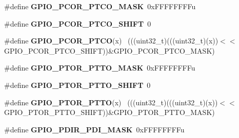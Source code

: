 \begin{DoxyCompactItemize}
\item 
\hypertarget{group___g_p_i_o___register___masks_ga0b8378768ee61ea2c685a1687c90fa03}{}\#define {\bfseries G\+P\+I\+O\+\_\+\+P\+C\+O\+R\+\_\+\+P\+T\+C\+O\+\_\+\+M\+A\+S\+K}~0x\+F\+F\+F\+F\+F\+F\+F\+Fu\label{group___g_p_i_o___register___masks_ga0b8378768ee61ea2c685a1687c90fa03}

\item 
\hypertarget{group___g_p_i_o___register___masks_ga5c9203b830cbd86cd8d0189872b5c772}{}\#define {\bfseries G\+P\+I\+O\+\_\+\+P\+C\+O\+R\+\_\+\+P\+T\+C\+O\+\_\+\+S\+H\+I\+F\+T}~0\label{group___g_p_i_o___register___masks_ga5c9203b830cbd86cd8d0189872b5c772}

\item 
\hypertarget{group___g_p_i_o___register___masks_ga3435ac6150be0f65562e575f41463272}{}\#define {\bfseries G\+P\+I\+O\+\_\+\+P\+C\+O\+R\+\_\+\+P\+T\+C\+O}(x)                                            ~(((uint32\+\_\+t)(((uint32\+\_\+t)(x))$<$$<$G\+P\+I\+O\+\_\+\+P\+C\+O\+R\+\_\+\+P\+T\+C\+O\+\_\+\+S\+H\+I\+F\+T))\&G\+P\+I\+O\+\_\+\+P\+C\+O\+R\+\_\+\+P\+T\+C\+O\+\_\+\+M\+A\+S\+K)\label{group___g_p_i_o___register___masks_ga3435ac6150be0f65562e575f41463272}

\item 
\hypertarget{group___g_p_i_o___register___masks_gaa75953b5d9d23bdaa6c24232e1a52680}{}\#define {\bfseries G\+P\+I\+O\+\_\+\+P\+T\+O\+R\+\_\+\+P\+T\+T\+O\+\_\+\+M\+A\+S\+K}~0x\+F\+F\+F\+F\+F\+F\+F\+Fu\label{group___g_p_i_o___register___masks_gaa75953b5d9d23bdaa6c24232e1a52680}

\item 
\hypertarget{group___g_p_i_o___register___masks_ga70e5442b3a119665aafb9e6e5b48bbd5}{}\#define {\bfseries G\+P\+I\+O\+\_\+\+P\+T\+O\+R\+\_\+\+P\+T\+T\+O\+\_\+\+S\+H\+I\+F\+T}~0\label{group___g_p_i_o___register___masks_ga70e5442b3a119665aafb9e6e5b48bbd5}

\item 
\hypertarget{group___g_p_i_o___register___masks_gad89d527b4c87f933192b313f79f96438}{}\#define {\bfseries G\+P\+I\+O\+\_\+\+P\+T\+O\+R\+\_\+\+P\+T\+T\+O}(x)                                            ~(((uint32\+\_\+t)(((uint32\+\_\+t)(x))$<$$<$G\+P\+I\+O\+\_\+\+P\+T\+O\+R\+\_\+\+P\+T\+T\+O\+\_\+\+S\+H\+I\+F\+T))\&G\+P\+I\+O\+\_\+\+P\+T\+O\+R\+\_\+\+P\+T\+T\+O\+\_\+\+M\+A\+S\+K)\label{group___g_p_i_o___register___masks_gad89d527b4c87f933192b313f79f96438}

\item 
\hypertarget{group___g_p_i_o___register___masks_gacb7c8cc976937906c8e803811a7fbb68}{}\#define {\bfseries G\+P\+I\+O\+\_\+\+P\+D\+I\+R\+\_\+\+P\+D\+I\+\_\+\+M\+A\+S\+K}~0x\+F\+F\+F\+F\+F\+F\+F\+Fu\label{group___g_p_i_o___register___masks_gacb7c8cc976937906c8e803811a7fbb68}


\end{DoxyCompactItemize}
